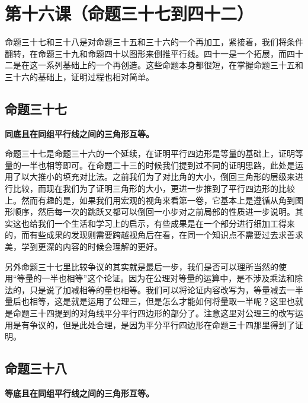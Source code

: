 \documentclass[
]{book}
\begin{document}
\hypertarget{ux7b2cux5341ux516dux8bfeux547dux9898ux4e09ux5341ux4e03ux5230ux56dbux5341ux4e8c}{%
\chapter{第十六课（命题三十七到四十二）}\label{ux7b2cux5341ux516dux8bfeux547dux9898ux4e09ux5341ux4e03ux5230ux56dbux5341ux4e8c}}

命题三十七和三十八是对命题三十五和三十六的一个再加工，紧接着，我们将条件翻转，在命题三十九和命题四十以图形来倒推平行线。四十一是一个拓展，而四十二是在这一系列基础上的一个再创造。这些命题本身都很短，在掌握命题三十五和三十六的基础上，证明过程也相对简单。

\hypertarget{ux547dux9898ux4e09ux5341ux4e03}{%
\section{命题三十七}\label{ux547dux9898ux4e09ux5341ux4e03}}

\textbf{同底且在同组平行线之间的三角形互等。}

命题三十七是命题三十六的一个延续，在证明平行四边形是等量的基础上，证明等量的一半也相等即可。在命题二十三的时候我们提到过不同的证明思路，此处是运用了以大推小的填充对比法。之前我们为了对比角的大小，倒回三角形的层级来进行比较，而现在我们为了证明三角形的大小，更进一步推到了平行四边形的比较上。然而有趣的是，如果我们用宏观的视角来看第一卷，它基本上是遵循从角到图形顺序，然后每一次的跳跃又都可以倒回一小步对之前局部的性质进一步说明。其实这也给我们一个生活和学习上的启示，有些成果是在一个部分进行细加工得来的，而有些成果的发现则需要跨越视角后在看，在同一个知识点不需要过去求善求美，学到更深的内容的时候会理解的更好。

另外命题三十七里比较争议的其实就是最后一步，我们是否可以理所当然的使用``等量的一半也相等''这个论证。因为在公理对等量的运算中，是不涉及乘法和除法的，只是说了加减相等的量也相等。我们可以将论证内容改写为，等量减去一半量后也相等，这是就是运用了公理三，但是怎么才能如何将量取一半呢？这里也就是命题三十四提到的对角线平分平行四边形的部分了。注意这里对公理三的改写运用是有争议的，但是此处合理，是因为平分平行四边形在命题三十四那里得到了证明。

\hypertarget{ux547dux9898ux4e09ux5341ux516b}{%
\section{命题三十八}\label{ux547dux9898ux4e09ux5341ux516b}}

\textbf{等底且在同组平行线之间的三角形互等。}
\end{document}
